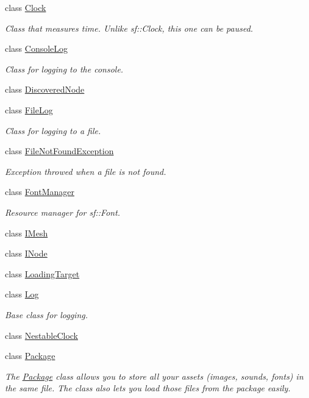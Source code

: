 \begin{DoxyCompactItemize}
class \hyperlink{classzt_1_1_clock}{Clock}
\begin{DoxyCompactList}\small\item\em Class that measures time. Unlike sf\+::\+Clock, this one can be paused. \end{DoxyCompactList}\item 
class \hyperlink{classzt_1_1_console_log}{Console\+Log}
\begin{DoxyCompactList}\small\item\em Class for logging to the console. \end{DoxyCompactList}\item 
class \hyperlink{classzt_1_1_discovered_node}{Discovered\+Node}
\item 
class \hyperlink{classzt_1_1_file_log}{File\+Log}
\begin{DoxyCompactList}\small\item\em Class for logging to a file. \end{DoxyCompactList}\item 
class \hyperlink{classzt_1_1_file_not_found_exception}{File\+Not\+Found\+Exception}
\begin{DoxyCompactList}\small\item\em Exception throwed when a file is not found. \end{DoxyCompactList}\item 
class \hyperlink{classzt_1_1_font_manager}{Font\+Manager}
\begin{DoxyCompactList}\small\item\em Resource manager for sf\+::\+Font. \end{DoxyCompactList}\item 
class \hyperlink{classzt_1_1_i_mesh}{I\+Mesh}
\item 
class \hyperlink{classzt_1_1_i_node}{I\+Node}
\item 
class \hyperlink{classzt_1_1_loading_target}{Loading\+Target}
\item 
class \hyperlink{classzt_1_1_log}{Log}
\begin{DoxyCompactList}\small\item\em Base class for logging. \end{DoxyCompactList}\item 
class \hyperlink{classzt_1_1_nestable_clock}{Nestable\+Clock}
\item 
class \hyperlink{classzt_1_1_package}{Package}
\begin{DoxyCompactList}\small\item\em The \hyperlink{classzt_1_1_package}{Package} class allows you to store all your assets (images, sounds, fonts) in the same file. The class also lets you load those files from the package easily. \end{DoxyCompactList}\item 

\end{DoxyCompactItemize}
